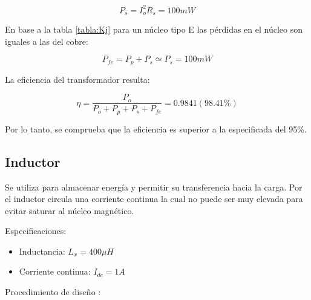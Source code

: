 $$ P_s=I_o^2R_s=100mW $$

En base a la tabla \ref{tabla:Kj} para un núcleo tipo E las pérdidas en el núcleo son iguales a las del cobre:

$$ P_{fe}=P_p+P_s \simeq P_s=100mW $$

La eficiencia del transformador resulta:

$$ \eta=\frac{P_o}{P_o+P_p+P_s+P_{fe}}=0.9841 (98.41\%) $$

Por lo tanto, se comprueba que la eficiencia es superior a la especificada del 95\%.  

\subsection{Inductor}

Se utiliza para almacenar energía y permitir su transferencia hacia la carga. 
Por el inductor circula una corriente continua la cual no puede ser muy elevada para evitar saturar al núcleo magnético. 

Especificaciones: 

\begin{itemize}
    \item Inductancia: $L_x=400\mu H$
    \item Corriente continua: $I_{dc}=1A$
\end{itemize}

Procedimiento de diseño \cite{diseno-trafo-kike}:

